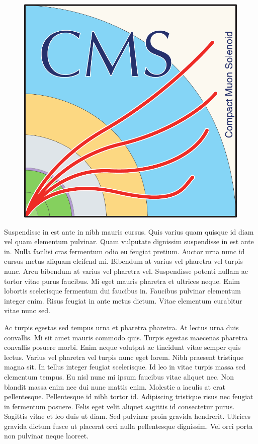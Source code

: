 \documentclass[landscape,a0paper,fontscale=0.42]{baposter} %
\begin{document}
\begin{poster}
{\begin{multicols}{2}
\begin{figure}
\begin{center}
\includegraphics[width=0.6\linewidth]{CMS_logo_May2014.pdf}
\end{center}
\end{figure}

Suspendisse in est ante in nibh mauris cursus. Quis varius quam quisque id diam vel quam elementum pulvinar. Quam vulputate dignissim suspendisse in est ante in. Nulla facilisi cras fermentum odio eu feugiat pretium. Auctor urna nunc id cursus metus aliquam eleifend mi. Bibendum at varius vel pharetra vel turpis nunc. Arcu bibendum at varius vel pharetra vel. Suspendisse potenti nullam ac tortor vitae purus faucibus. Mi eget mauris pharetra et ultrices neque. Enim lobortis scelerisque fermentum dui faucibus in. Faucibus pulvinar elementum integer enim. Risus feugiat in ante metus dictum. Vitae elementum curabitur vitae nunc sed.

\end{multicols}
Ac turpis egestas sed tempus urna et pharetra pharetra. At lectus urna duis convallis. Mi sit amet mauris commodo quis. Turpis egestas maecenas pharetra convallis posuere morbi. Enim neque volutpat ac tincidunt vitae semper quis lectus. Varius vel pharetra vel turpis nunc eget lorem. Nibh praesent tristique magna sit. In tellus integer feugiat scelerisque. Id leo in vitae turpis massa sed elementum tempus. Eu nisl nunc mi ipsum faucibus vitae aliquet nec. Non blandit massa enim nec dui nunc mattis enim. Molestie a iaculis at erat pellentesque. Pellentesque id nibh tortor id. Adipiscing tristique risus nec feugiat in fermentum posuere. Felis eget velit aliquet sagittis id consectetur purus. Sagittis vitae et leo duis ut diam. Sed pulvinar proin gravida hendrerit. Ultrices gravida dictum fusce ut placerat orci nulla pellentesque dignissim. Vel orci porta non pulvinar neque laoreet.

}
\end{poster}
\end{document}
